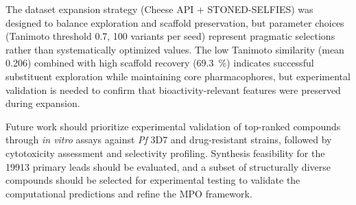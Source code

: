 \documentclass[journal=jcisd8,manuscript=article]{achemso}
\begin{document}
The dataset expansion strategy (Cheese API + STONED-SELFIES) was designed to balance exploration and scaffold preservation, but parameter choices (Tanimoto
threshold \num{0.7}, \num{100} variants per seed) represent pragmatic selections rather than systematically optimized values. The low Tanimoto similarity (mean
\num{0.206}) combined with high scaffold recovery (\qty{69.3}{\percent}) indicates successful substituent exploration while maintaining core pharmacophores, but
experimental validation is needed to confirm that bioactivity-relevant features were preserved during expansion.

Future work should prioritize experimental validation of top-ranked compounds through \textit{in vitro} assays against \textit{Pf} 3D7 and drug-resistant
strains, followed by cytotoxicity assessment and selectivity profiling. Synthesis feasibility for the \num{19913} primary leads should be evaluated, and a
subset of structurally diverse compounds should be selected for experimental testing to validate the computational predictions and refine the MPO framework.
\end{document}

